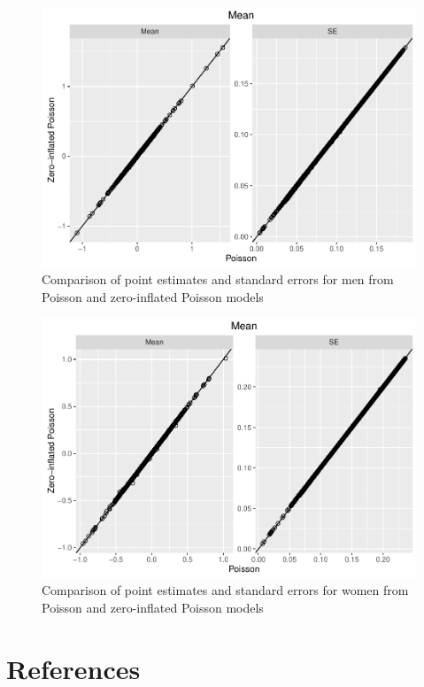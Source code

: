 \documentclass[]{article}
\begin{document}
\begin{figure}[htbp]
\centering
\includegraphics{Thesis_files/figure-latex/male-zipois-1.pdf}
\caption{Comparison of point estimates and standard errors for men from
Poisson and zero-inflated Poisson models}
\end{figure}

\begin{figure}[htbp]
\centering
\includegraphics{Thesis_files/figure-latex/female-zipois-1.pdf}
\caption{Comparison of point estimates and standard errors for women
from Poisson and zero-inflated Poisson models}
\end{figure}

\pagebreak

\section*{References}\label{references}
\end{document}
